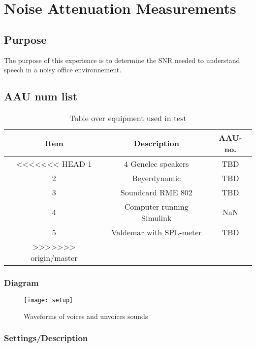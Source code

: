 \section{Noise Attenuation Measurements}

\subsection{Purpose}

The purpose of this experience is to determine the SNR needed to understand speech in a noisy office environnement.  

\subsection{AAU num list}

\begin{table}[h]
	\centering
	
	\begin{tabular}{ c c c } \toprule
		{Item} & {Description} & {AAU-no}. \\ \bottomrule 
<<<<<<< HEAD %
		1      	&  4 Genelec speakers					& TBD		\\
		2      	&  Beyerdynamic 						& TBD		\\
		3      	&  Soundcard RME 802                   	& TBD		\\
		4      	&  Computer	running Simulink			& NaN		\\  
		5		&  Valdemar with SPL-meter				& TBD		\\ \bottomrule 
>>>>>>> origin/master %
	\end{tabular}
	\caption{Table over equipment used in test}
	\label{tab:UsedEquipmentListning1}
\end{table}



\subsubsection{Diagram}

\begin{figure}[H]
	\centering
	\texttt{[image: setup]}
	\caption{Waveforms of voices and unvoices sounds}
	\label{fig1}
\end{figure}


\subsubsection{Settings/Description}

